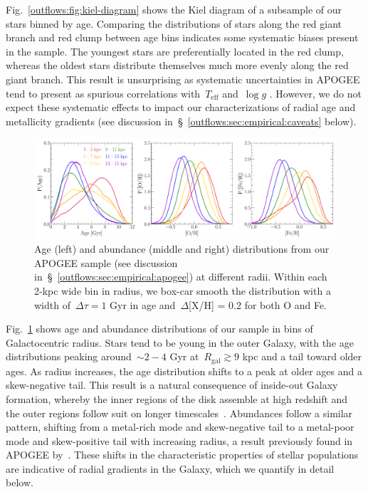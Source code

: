 Fig.~\ref{outflows:fig:kiel-diagram} shows the Kiel diagram of a subsample of
our stars binned by age.
Comparing the distributions of stars along the red giant branch and red clump
between age bins indicates some systematic biases present in the sample.
The youngest stars are preferentially located in the red clump, whereas the
oldest stars distribute themselves much more evenly along the red giant branch.
This result is unsurprising as systematic uncertainties in APOGEE tend to
present as spurious correlations with~$T_\text{eff}$ and~$\log g$
\citep[e.g.,][]{Joensson2018, Eilers2022}.
However, we do not expect these systematic effects to impact our
characterizations of radial age and metallicity gradients (see discussion
in~\S~\ref{outflows:sec:empirical:caveats} below).

\clearpage
\begin{landscape}
\begin{figure}
\centering
\includegraphics[scale = 0.55]{age_xh_dists.pdf}
\caption{
Age (left) and abundance (middle and right) distributions from our APOGEE
sample (see discussion in~\S~\ref{outflows:sec:empirical:apogee}) at different
radii.
Within each 2-kpc wide bin in radius, we box-car smooth the distribution with a
width of~$\Delta \tau = 1$ Gyr in age and~$\Delta$[X/H] = 0.2 for both O and
Fe.
}
\label{outflows:fig:age-xh-dists}
\end{figure}
\end{landscape}
\clearpage

Fig.~\ref{outflows:fig:age-xh-dists} shows age and abundance distributions of
our sample in bins of Galactocentric radius.
Stars tend to be young in the outer Galaxy, with the age distributions peaking
around~$\sim$$2-4$ Gyr at~$R_\text{gal} \gtrsim 9$ kpc and a tail toward older
ages.
As radius increases, the age distribution shifts to a peak at older ages and a
skew-negative tail.
This result is a natural consequence of inside-out Galaxy formation, whereby
the inner regions of the disk assemble at high redshift and the outer regions
follow suit on longer timescales~\citep[e.g.,][]{White1991, Bird2013}.
Abundances follow a similar pattern, shifting from a metal-rich mode and
skew-negative tail to a metal-poor mode and skew-positive tail with increasing
radius, a result previously found in APOGEE by~\citet{Hayden2015}.
These shifts in the characteristic properties of stellar populations are
indicative of radial gradients in the Galaxy, which we quantify in detail
below.


